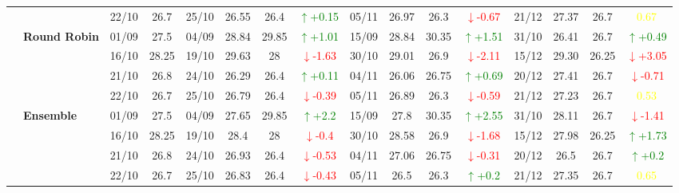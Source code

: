 \documentclass{ieeeaccess}
\begin{document}
{\begin{longtable}{llcc|cccc|cccc|cccc}
&
& 22/10 & 26.7 & 25/10 & 26.55 & 26.4 & \textcolor{green}{\(\uparrow\)+0.15} & 05/11 & 26.97 & 26.3 & \textcolor{red}{\(\downarrow\)-0.67} & 21/12 & 27.37 & 26.7 & \textcolor{yellow}{0.67} \\
\cmidrule(lr){2-16}


& \textbf{Round Robin}
& 01/09 & 27.5 & 04/09 & 28.84 & 29.85 & \textcolor{green}{\(\uparrow\)+1.01} & 15/09 & 28.84 & 30.35 & \textcolor{green}{\(\uparrow\)+1.51} & 31/10 & 26.41 & 26.7 & \textcolor{green}{\(\uparrow\)+0.49} \\

& 
& 16/10 & 28.25 & 19/10 & 29.63 & 28 & \textcolor{red}{\(\downarrow\)-1.63} & 30/10 & 29.01 & 26.9 & \textcolor{red}{\(\downarrow\)-2.11} & 15/12 & 29.30 & 26.25 & \textcolor{red}{\(\downarrow\)+3.05} \\

& 
& 21/10 & 26.8 & 24/10 & 26.29 & 26.4 & \textcolor{green}{\(\uparrow\)+0.11} & 04/11 & 26.06 & 26.75 & \textcolor{green}{\(\uparrow\)+0.69} & 20/12 & 27.41 & 26.7 & \textcolor{red}{\(\downarrow\)-0.71} \\

&
& 22/10 & 26.7 & 25/10 & 26.79 & 26.4 & \textcolor{red}{\(\downarrow\)-0.39} & 05/11 & 26.89 & 26.3 & \textcolor{red}{\(\downarrow\)-0.59} & 21/12 & 27.23 & 26.7 & \textcolor{yellow}{0.53} \\
\cmidrule(lr){2-16}


& \textbf{Ensemble}
& 01/09 & 27.5 & 04/09 & 27.65 & 29.85& \textcolor{green}{\(\uparrow\)+2.2} & 15/09 & 27.8 & 30.35 & \textcolor{green}{\(\uparrow\)+2.55} & 31/10 & 28.11 & 26.7 & \textcolor{red}{\(\downarrow\)-1.41} \\

& 
& 16/10 & 28.25 & 19/10 & 28.4 & 28 & \textcolor{red}{\(\downarrow\)-0.4} & 30/10 & 28.58 & 26.9 & \textcolor{red}{\(\downarrow\)-1.68} & 15/12 & 27.98 & 26.25 & \textcolor{green}{\(\uparrow\)+1.73} \\

& 
& 21/10 & 26.8 & 24/10 & 26.93 & 26.4 & \textcolor{red}{\(\downarrow\)-0.53} & 04/11 & 27.06 & 26.75 & \textcolor{red}{\(\downarrow\)-0.31} & 20/12 & 26.5 & 26.7 & \textcolor{green}{\(\uparrow\)+0.2} \\

&
& 22/10 & 26.7 & 25/10 & 26.83 & 26.4 & \textcolor{red}{\(\downarrow\)-0.43} & 05/11 & 26.5 & 26.3 & \textcolor{green}{\(\uparrow\)+0.2} & 21/12 & 27.35 & 26.7 & \textcolor{yellow}{0.65} \\
\midrule




\end{longtable}}
\end{document}
